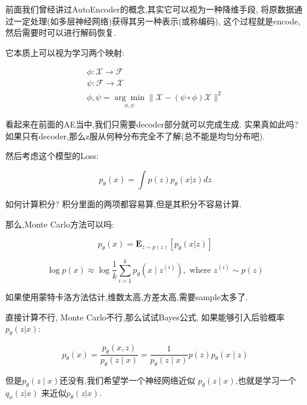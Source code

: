 	前面我们曾经讲过AutoEncoder的概念,其实它可以视为一种降维手段,
	将原数据通过一定处理(如多层神经网络)获得其另一种表示(或称编码),
	这个过程就是encode,然后需要时可以进行解码恢复.
	
	它本质上可以视为学习两个映射:

	\begin{equation}
		\begin{array}{l}
			\phi: \mathcal{X} \rightarrow \mathcal{F} \\
			\psi: \mathcal{F} \rightarrow \mathcal{X} \\
			\phi, \psi=\underset{\phi, \psi}{\arg \min }\|\mathcal{X}-(\psi \circ \phi) \mathcal{X}\|^{2}
		\end{array}
	\end{equation}

	看起来在前面的AE当中,我们只需要decoder部分就可以完成生成.
	实果真如此吗?如果只有decoder,那么z服从何种分布完全不了解(总不能是均匀分布吧).

	然后考虑这个模型的Loss:

	\begin{equation}
		p_\theta(x)=\int p(z)p_\theta(x|z)dz
	\end{equation}

	如何计算积分?
	积分里面的两项都容易算,但是其积分不容易计算.
	
	那么,Monte Carlo方法可以吗:
	
	\begin{equation}
		p_\theta(x)=\mathbf{E}_{z\sim p(z)}[p_\theta(x|z)]
	\end{equation}
		
	\begin{equation}
			\log p(x) \approx \log \frac{1}{k} \sum_{i=1}^{k} p_{\theta}\left(x \mid z^{(i)}\right), \text { where } z^{(i)} \sim p(z)
	\end{equation}
	
	如果使用蒙特卡洛方法估计,维数太高,方差太高,需要sample太多了.

	直接计算不行, Monte Carlo不行,那么试试Bayes公式,
	如果能够引入后验概率$p_{\theta}(z|x)$:

	\begin{equation}
		p_{\theta}(x)=\frac{p_{\theta}(x, z)}{p_{\theta}(z \mid x)}=
		\frac{1}{p_{\theta}(z \mid x)} p(z) p_{\theta}(x \mid z)
	\end{equation}

	但是$p_{\theta}(z \mid x)$还没有,我们希望学一个神经网络近似
	$p_{\theta}(z \mid x)$,也就是学习一个$q_{\phi}(z|x)$
	来近似$p_{\theta}(z|x)$.

